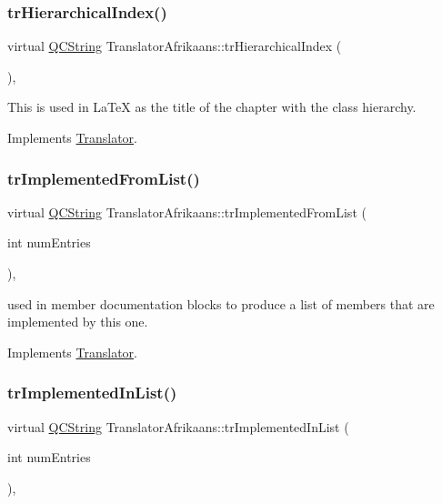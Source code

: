 \subsubsection{\texorpdfstring{trHierarchicalIndex()}{trHierarchicalIndex()}}
{\footnotesize\ttfamily virtual \mbox{\hyperlink{class_q_c_string}{Q\+C\+String}} Translator\+Afrikaans\+::tr\+Hierarchical\+Index (\begin{DoxyParamCaption}{ }\end{DoxyParamCaption})\hspace{0.3cm}{\ttfamily [inline]}, {\ttfamily [virtual]}}

This is used in La\+TeX as the title of the chapter with the class hierarchy. 

Implements \mbox{\hyperlink{class_translator}{Translator}}.

\mbox{\label{class_translator_afrikaans_a664b0ec1ad09e02f3ee9c67b7c0a8ab3}} 
\subsubsection{\texorpdfstring{trImplementedFromList()}{trImplementedFromList()}}
{\footnotesize\ttfamily virtual \mbox{\hyperlink{class_q_c_string}{Q\+C\+String}} Translator\+Afrikaans\+::tr\+Implemented\+From\+List (\begin{DoxyParamCaption}\item[{int}]{num\+Entries }\end{DoxyParamCaption})\hspace{0.3cm}{\ttfamily [inline]}, {\ttfamily [virtual]}}

used in member documentation blocks to produce a list of members that are implemented by this one. 

Implements \mbox{\hyperlink{class_translator}{Translator}}.

\mbox{\label{class_translator_afrikaans_a4df15ae004d9b050cbcd73e4122c8be0}} 
\subsubsection{\texorpdfstring{trImplementedInList()}{trImplementedInList()}}
{\footnotesize\ttfamily virtual \mbox{\hyperlink{class_q_c_string}{Q\+C\+String}} Translator\+Afrikaans\+::tr\+Implemented\+In\+List (\begin{DoxyParamCaption}\item[{int}]{num\+Entries }\end{DoxyParamCaption})\hspace{0.3cm}{\ttfamily [inline]}, {\ttfamily [virtual]}}


